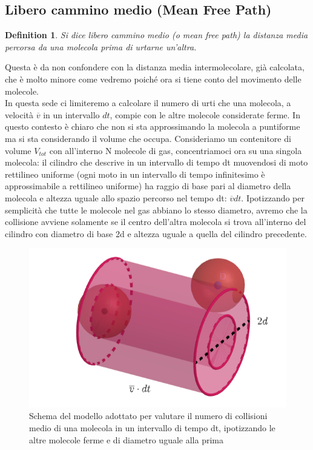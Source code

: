\documentclass[10pt,a4paper]{article}
\newtheorem{definition}{Definition}
\begin{document}
\subsection{Libero cammino medio (Mean Free Path)}
\begin{definition}
Si dice libero cammino medio (o mean free path) la distanza media percorsa da una molecola prima di urtarne un’altra. 
\end{definition}
Questa è da non confondere con la distanza media intermolecolare, già calcolata, che è molto minore come vedremo poiché ora si tiene conto del movimento delle molecole.\\
In questa sede ci limiteremo a calcolare il numero di urti che una molecola, a velocità $\overline{v}$ in un intervallo $dt$, compie con le altre molecole considerate ferme. In questo contesto è chiaro che non si sta approssimando la molecola a puntiforme ma si sta considerando il volume che occupa. Consideriamo un contenitore di volume $V_{tot}$ con all'interno N molecole di gas, concentriamoci ora su una singola molecola: il cilindro che descrive in un intervallo di tempo dt muovendosi di moto rettilineo uniforme (ogni moto in un intervallo di tempo infinitesimo è approssimabile a rettilineo uniforme) ha raggio di base pari al diametro della molecola e altezza uguale allo spazio percorso nel tempo dt: $\overline{v}dt$. Ipotizzando per semplicità che tutte le molecole nel gas abbiano lo stesso diametro, avremo che la collisione avviene solamente se il centro dell'altra molecola si trova all'interno del cilindro con diametro di base 2d e altezza uguale a quella del cilindro precedente.  
\begin{figure}[h!]
	\centering
	\includegraphics[width=0.7\linewidth]{../images/libero_cammino_medio}
	\caption{Schema del modello adottato per valutare il numero di collisioni medio di una molecola in un intervallo di tempo dt, ipotizzando le altre molecole ferme e di diametro uguale alla prima}
	\label{fig:liberocamminomedio}
\end{figure}
\end{document}
